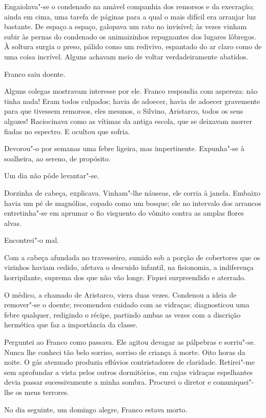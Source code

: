 Engaiolava"-se o condenado na amável companhia dos remorsos e
da execração; ainda em cima, uma tarefa de páginas para a qual o mais
difícil era arranjar luz bastante. De espaço a espaço, galopava um rato
no invisível; às vezes vinham subir às pernas do condenado os
animaizinhos repugnantes dos lugares lôbregos. À soltura surgia o
preso, pálido como um redivivo, espantado do ar claro como de uma coisa
incrível. Alguns achavam meio de voltar verdadeiramente abatidos.

Franco saiu doente. 

Alguns colegas mostravam interesse por ele. Franco
respondia com aspereza: não tinha nada! Eram todos culpados; havia de
adoecer, havia de adoecer gravemente para que tivessem remorsos, eles
mesmos, o Silvino, Aristarco, todos os seus algozes! Raciocinava como
as vítimas da antiga escola, que se deixavam morrer fiadas no espectro.
E ocultou que sofria. 

Devorou"-o por semanas uma febre ligeira, mas
impertinente. Expunha"-se à soalheira, ao sereno, de propósito. 

Um dia não pôde levantar"-se. 

Dorzinha de cabeça, explicava. Vinham"-lhe
náuseas, ele corria à janela. Embaixo havia um pé de magnólias, copado
como um bosque; ele no intervalo dos arrancos entretinha"-se em
aprumar o fio visguento do vômito contra as amplas flores alvas.

Encontrei"-o mal. 

Com a cabeça afundada no travesseiro, sumido sob a
porção de cobertores que os vizinhos haviam cedido, afetava o descuido
infantil, na fisionomia, a indiferença horripilante, suprema dos que
não vão longe. Fiquei surpreendido e aterrado. 

O médico, a chamado de
Aristarco, viera duas vezes. Condenou a ideia de remover"-se o doente;
recomendou cuidado com as vidraças; diagnosticou uma febre qualquer,
redigindo o récipe, partindo ambas as vezes com a discrição hermética
que faz a importância da classe. 

Perguntei ao Franco como passava. Ele
agitou devagar as pálpebras e sorriu"-se. Nunca lhe conheci tão belo
sorriso, sorriso de criança à morte. Oito horas da noite. O gás
atenuado produzia eflúvios contristadores de claridade. Retirei"-me
sem aprofundar a vista pelos outros dormitórios, em cujas vidraças
espelhantes devia passar sucessivamente a minha sombra. Procurei o
diretor e comuniquei"-lhe os meus terrores. 

No dia seguinte, um domingo alegre, Franco estava morto. 

